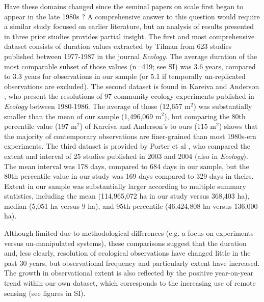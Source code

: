 \documentclass[12pt]{article}
\begin{document}
Have these domains changed since the seminal papers on scale first began to appear in the late 1980s \cite{wiens_spatial_1989, levin_problem_1992, tilman_ecological_1989}? A comprehensive answer to this question would require a similar study focused on earlier literature, but an analysis of results presented in three prior studies provides partial insight. The first and most comprehensive dataset consists of duration values extracted by Tilman \cite{tilman_ecological_1989} from 623 studies published between 1977-1987 in the journal \emph{Ecology}. The average duration of the most comparable subset of those values (n=419; see SI) was 3.6 years, compared to 3.3 years for observations in our sample (or 5.1 if temporally un-replicated observations are excluded). The second dataset is found in Kareiva and Anderson \cite{kareiva_spatial_1988}, who present the resolutions of 97 community ecology experiments published in \emph{Ecology} between 1980-1986. The average of those (12,657 m$^2$) was substantially smaller than the mean of our sample (1,496,069 m$^2$), but comparing the 80th percentile value (197 m$^2$) of Kareiva and Anderson's \cite{kareiva_spatial_1988} to ours (115 m$^2$) shows that the majority of contemporary observations are finer-grained than most 1980s-era experiments. The third dataset is provided by Porter et al \cite{porter_wireless_2005}, who compared the extent and interval of 25 studies published in 2003 and 2004 (also in \emph{Ecology}). The mean interval was 178 days, compared to 684 days in our sample, but the 80th percentile value in our study was 169 days compared to 329 days in theirs. Extent in our sample was substantially larger according to multiple summary statistics, including the mean (114,965,072 ha in our study versus 368,403 ha), median (5,051 ha versus 9 ha), and 95th percentile (46,424,808 ha versus 136,000 ha).  

Although limited due to methodological differences (e.g. a focus on experiments versus un-manipulated systems), these comparisons suggest that the duration and, less clearly, resolution of ecological observations have changed little in the past 30 years, but observational frequency and particularly extent have increased. The growth in observational extent is also reflected by the positive year-on-year trend within our own dataset, which corresponds to the increasing use of remote sensing (see figures in SI).  
\end{document}
